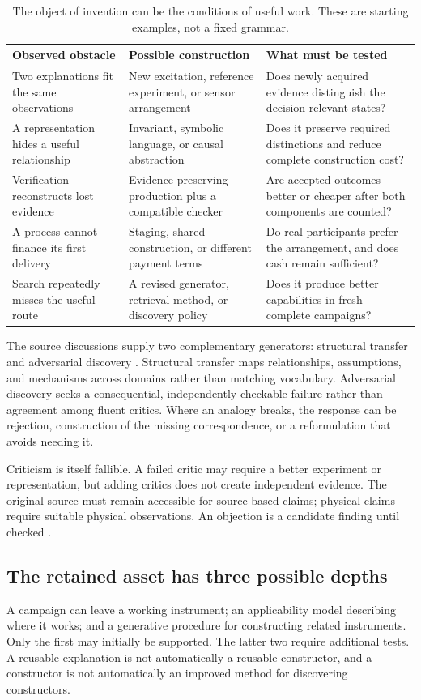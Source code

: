 \documentclass[11pt,letterpaper]{article}
\theoremstyle{remark}\newtheorem{remark}{Remark}[section]
\begin{document}
\begin{table}[htbp]
\caption{The object of invention can be the conditions of useful work. These are starting examples, not a fixed grammar.}
\begin{tabularx}{\linewidth}{P{3.1cm}YY}
\toprule
\textbf{Observed obstacle}&\textbf{Possible construction}&\textbf{What must be tested}\\\midrule
Two explanations fit the same observations&New excitation, reference experiment, or sensor arrangement&Does newly acquired evidence distinguish the decision-relevant states?\\
A representation hides a useful relationship&Invariant, symbolic language, or causal abstraction&Does it preserve required distinctions and reduce complete construction cost?\\
Verification reconstructs lost evidence&Evidence-preserving production plus a compatible checker&Are accepted outcomes better or cheaper after both components are counted?\\
A process cannot finance its first delivery&Staging, shared construction, or different payment terms&Do real participants prefer the arrangement, and does cash remain sufficient?\\
Search repeatedly misses the useful route&A revised generator, retrieval method, or discovery policy&Does it produce better capabilities in fresh complete campaigns?\\\bottomrule
\end{tabularx}
\end{table}

The source discussions supply two complementary generators: structural transfer and adversarial discovery \citep{notes30,notes29,notes18}. Structural transfer maps relationships, assumptions, and mechanisms across domains rather than matching vocabulary. Adversarial discovery seeks a consequential, independently checkable failure rather than agreement among fluent critics. Where an analogy breaks, the response can be rejection, construction of the missing correspondence, or a reformulation that avoids needing it.

Criticism is itself fallible. A failed critic may require a better experiment or representation, but adding critics does not create independent evidence. The original source must remain accessible for source-based claims; physical claims require suitable physical observations. An objection is a candidate finding until checked \citep{notes18,critic}.

\subsection{The retained asset has three possible depths}
A campaign can leave a working instrument; an applicability model describing where it works; and a generative procedure for constructing related instruments. Only the first may initially be supported. The latter two require additional tests. A reusable explanation is not automatically a reusable constructor, and a constructor is not automatically an improved method for discovering constructors.
\end{document}
